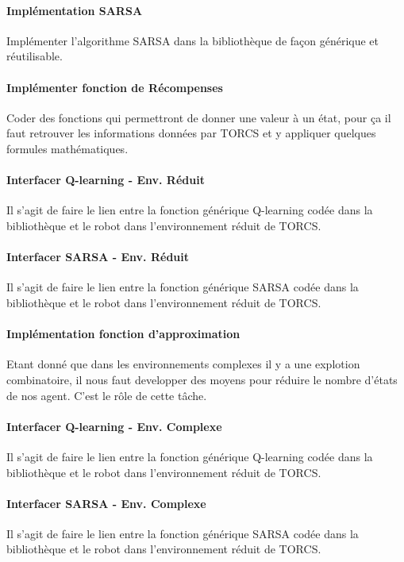 \documentclass[a4paper,12pt]{article}
\begin{document}
      \paragraph{Implémentation SARSA} Implémenter l'algorithme SARSA dans la bibliothèque de façon générique
      et réutilisable.
      
      \paragraph{Implémenter fonction de Récompenses} Coder des fonctions qui permettront de donner une valeur à un état,
      pour ça il faut retrouver les informations données par TORCS et y appliquer quelques formules mathématiques.
      
      \paragraph{Interfacer Q-learning - Env. Réduit} Il s'agit de faire le lien entre la fonction générique Q-learning
      codée dans la bibliothèque et le robot dans l'environnement réduit de TORCS. 
      
      \paragraph{Interfacer SARSA - Env. Réduit} Il s'agit de faire le lien entre la fonction générique SARSA
      codée dans la bibliothèque et le robot dans l'environnement réduit de TORCS. 
      
      \paragraph{Implémentation fonction d'approximation} Etant donné que dans les environnements complexes il y a une
      explotion combinatoire, il nous faut developper des moyens pour réduire le nombre d'états de nos agent. C'est le
      rôle de cette tâche.
      
      \paragraph{Interfacer Q-learning - Env. Complexe} Il s'agit de faire le lien entre la fonction générique Q-learning
      codée dans la bibliothèque et le robot dans l'environnement réduit de TORCS. 
      
      \paragraph{Interfacer SARSA - Env. Complexe} Il s'agit de faire le lien entre la fonction générique SARSA
      codée dans la bibliothèque et le robot dans l'environnement réduit de TORCS. 
      
\end{document}
